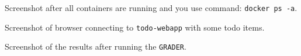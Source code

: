 \documentclass[a4paper, 10pt]{article}
\begin{document}
\begin{problem}
Screenshot after all containers are running and you use command: \texttt{docker ps -a}.
\end{problem}

\begin{solution}
\end{solution}

\begin{problem}
Screenshot of browser connecting to \texttt{todo-webapp} with some todo items.
\end{problem}

\begin{solution}
\end{solution}

\begin{problem}
Screenshot of the results after running the \texttt{GRADER}.
\end{problem}

\begin{solution}
\end{solution}
\end{document}
